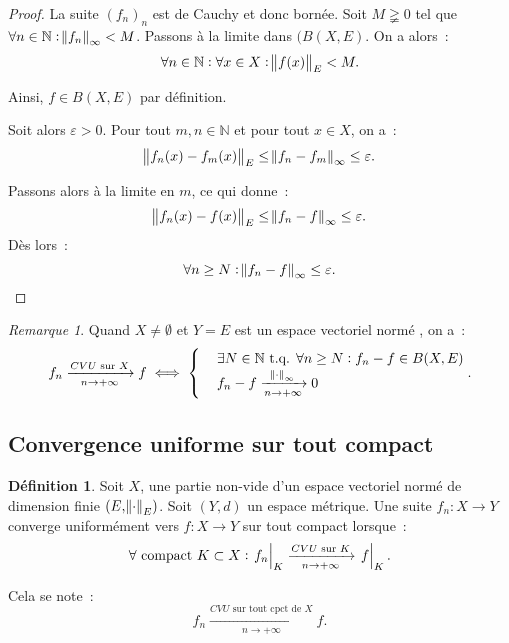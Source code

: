 \documentclass{report}
\theoremstyle{definition}
\newtheorem{déf}[thm]{Définition}
\theoremstyle{remark}
\newtheorem*{rmq}{Remarque}
\numberwithin{equation}{section}
\newcommand{\N}{\mathbb N}
\newcommand{\tq}{\text{ t.q. }}
\newcommand{\CONV}[5]{\xrightarrow[#2 \to #3]{#4 \text{ #5 } #1}}
\newcommand{\CVU}[3]{\CONV{#1}{#2}{#3}{CVU}{sur}}
\newcommand{\CVUc}[3]{\CONV{#1}{#2}{#3}{CVU}{sur tout cpct de}}
\newcommand{\restr}[2]{\left.#1\vphantom{\big|}\right|_{#2}}
\newcommand{\pinfty}{{+\infty}}
\newcommand{\evn}{espace vectoriel normé }
\begin{document}
\begin{proof}
			La suite $(f_n)_n$ est de Cauchy et donc bornée. Soit $M \gneqq 0$ tel que $\forall n \in \N : \norm {f_n}_\infty < M$. Passons à la limite dans
			$(B(X, E)$. On a alors~:
			\begin{equation}
				\forall n \in \N : \forall x \in X : \norm {f(x)}_E < M.
			\end{equation}

			Ainsi, $f \in B(X, E)$ par définition.

			Soit alors $\varepsilon > 0$. Pour tout $m, n \in \N$ et pour tout $x \in X$, on a~:
			\begin{equation}
				\norm {f_n(x) - f_m(x)}_E  \leq \norm {f_n - f_m}_\infty \leq \varepsilon.
			\end{equation}

			Passons alors à la limite en $m$, ce qui donne~:
			\begin{equation}
				\norm {f_n(x) - f(x)}_E \leq \norm {f_n - f}_\infty \leq \varepsilon.
			\end{equation}
			Dès lors~:
			\begin{equation}
				\forall n \geq N : \norm {f_n - f}_\infty \leq \varepsilon.
			\end{equation}
			\end{proof}

			\begin{rmq} Quand $X \neq \emptyset$ et $Y = E$ est un \evn, on a~:
			\begin{equation}
				f_n \CVU Xn\pinfty f \iff
				\begin{cases}&\exists N \in \N \tq \forall n \geq N : f_n - f \in B(X, E) \\ &f_n - f \xrightarrow[n \to \pinfty]{\norm \cdot_\infty} 0\end{cases}.
			\end{equation}
			\end{rmq}

		\subsection{Convergence uniforme sur tout compact}
			\begin{déf} Soit $X$, une partie non-vide d'un \evn de dimension finie $(E, \norm \cdot_E)$. Soit $(Y, d)$ un espace métrique.
			Une suite $f_n : X \to Y$ converge uniformément vers $f : X \to Y$ sur tout compact lorsque~:
			\begin{equation}
				\forall \text{ compact } K \subset X : \restr {f_n}K \CVU Kn\pinfty \restr fK.
			\end{equation}

			Cela se note~:
			\begin{equation}
				f_n \CVUc Xn\pinfty f.
			\end{equation}
			\end{déf}
\end{document}

